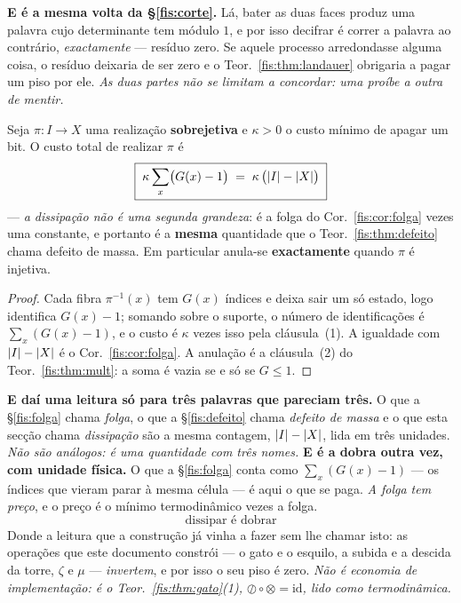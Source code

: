 \documentclass[livro.tex]{subfiles}
\begin{document}
\medskip\noindent\textbf{E é a mesma volta da §\ref{fis:corte}.} Lá, bater as duas
faces produz uma palavra cujo determinante tem módulo $1$, e por isso decifrar é
correr a palavra ao contrário, \emph{exactamente} --- resíduo zero. Se aquele
processo arredondasse alguma coisa, o resíduo deixaria de ser zero e o
Teor.~\ref{fis:thm:landauer} obrigaria a pagar um piso por ele. \emph{As duas
partes não se limitam a concordar: uma proíbe a outra de mentir.}
\begin{corolario}\label{fis:cor:custofolga}
Seja $\pi\colon I\to X$ uma realização \textbf{sobrejetiva} e $\kappa>0$ o custo
mínimo de apagar um bit. O custo total de realizar $\pi$ é
\[
\boxed{\;\kappa\sum_{x}\bigl(G(x)-1\bigr)\;=\;\kappa\,\bigl(\lvert I\rvert-\lvert X\rvert\bigr)\;}
\]
--- \emph{a dissipação não é uma segunda grandeza}: é a folga do
Cor.~\ref{fis:cor:folga} vezes uma constante, e portanto é a \textbf{mesma}
quantidade que o Teor.~\ref{fis:thm:defeito} chama defeito de massa. Em
particular anula-se \textbf{exactamente} quando $\pi$ é injetiva.
\end{corolario}

\begin{proof}
Cada fibra $\pi^{-1}(x)$ tem $G(x)$ índices e deixa sair um só estado, logo
identifica $G(x)-1$; somando sobre o suporte, o número de identificações é
$\sum_x(G(x)-1)$, e o custo é $\kappa$ vezes isso pela cláusula~(1). A igualdade
com $\lvert I\rvert-\lvert X\rvert$ é o Cor.~\ref{fis:cor:folga}. A anulação é a cláusula~(2)
do Teor.~\ref{fis:thm:mult}: a soma é vazia se e só se $G\le1$.
\end{proof}

\medskip\noindent\textbf{E daí uma leitura só para três palavras que pareciam
três.} O que a §\ref{fis:folga} chama \emph{folga}, o que a §\ref{fis:defeito}
chama \emph{defeito de massa} e o que esta secção chama \emph{dissipação} são a
mesma contagem, $\lvert I\rvert-\lvert X\rvert$, lida em três unidades. \emph{Não são análogos:
é uma quantidade com três nomes.}
\medskip\noindent\textbf{E é a dobra outra vez, com unidade física.} O que a
§\ref{fis:folga} conta como $\sum_x(G(x)-1)$ --- os índices que vieram parar à
mesma célula --- é aqui o que se paga. \emph{A folga tem preço}, e o preço é o
mínimo termodinâmico vezes a folga.
\[
\boxed{\;\text{dissipar é dobrar}\;}
\]
Donde a leitura que a construção já vinha a fazer sem lhe chamar isto: as
operações que este documento constrói --- o gato e o esquilo, a subida e a
descida da torre, $\zeta$ e $\mu$ --- \emph{invertem}, e por isso o seu piso é
zero. \emph{Não é economia de implementação: é o Teor.~\ref{fis:thm:gato}(1),
$\oslash\circ\otimes=\mathrm{id}$, lido como termodinâmica.}
\end{document}

